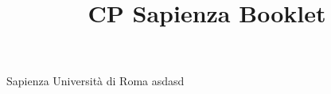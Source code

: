 \documentclass[9pt, a4paper, notitlepage]{extreport}
\title{CP Sapienza Booklet}
\begin{document}
\begin{multicols*}{3}

\begin{center}
  \huge Sapienza Università di Roma asdasd
  \vspace{1.5em}
\end{center}

\tableofcontents
\vfill\null
\columnbreak











\end{multicols*}
\end{document}

